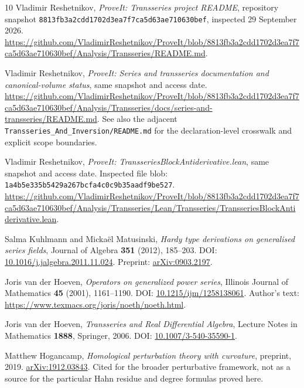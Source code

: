 \documentclass[11pt,a4paper]{article}
\numberwithin{equation}{section}
\theoremstyle{definition}
\theoremstyle{remark}
\begin{document}
\begin{thebibliography}{10}
\small
{}
Vladimir Reshetnikov, \emph{ProveIt: Transseries project README}, repository snapshot
\texttt{8813fb3a2cdd1702d3ea7f7ca5d63ae710630bef}, inspected 29 September 2026.
\url{https://github.com/VladimirReshetnikov/ProveIt/blob/8813fb3a2cdd1702d3ea7f7ca5d63ae710630bef/Analysis/Transseries/README.md}.

Vladimir Reshetnikov, \emph{ProveIt: Series and transseries documentation and canonical-volume status}, same snapshot and access date.
\url{https://github.com/VladimirReshetnikov/ProveIt/blob/8813fb3a2cdd1702d3ea7f7ca5d63ae710630bef/Analysis/Transseries/docs/series-and-transseries/README.md}.
See also the adjacent \texttt{Transseries\_And\_Inversion/README.md} for the declaration-level crosswalk and explicit scope boundaries.

Vladimir Reshetnikov, \emph{ProveIt: TransseriesBlockAntiderivative.lean}, same snapshot and access date. Inspected file blob:
\texttt{1a4b5e335b5429a267bcfa4c0c9b35aadf9be527}.
\url{https://github.com/VladimirReshetnikov/ProveIt/blob/8813fb3a2cdd1702d3ea7f7ca5d63ae710630bef/Analysis/Transseries/Lean/Transseries/TransseriesBlockAntiderivative.lean}.

Salma Kuhlmann and Micka\"el Matusinski,
\emph{Hardy type derivations on generalised series fields},
Journal of Algebra \textbf{351} (2012), 185--203.
DOI: \href{https://doi.org/10.1016/j.jalgebra.2011.11.024}{10.1016/j.jalgebra.2011.11.024}.
Preprint: \href{https://arxiv.org/abs/0903.2197}{arXiv:0903.2197}.

Joris van der Hoeven, \emph{Operators on generalized power series},
Illinois Journal of Mathematics \textbf{45} (2001), 1161--1190.
DOI: \href{https://doi.org/10.1215/ijm/1258138061}{10.1215/ijm/1258138061}.
Author's text: \url{https://www.texmacs.org/joris/noeth/noeth.html}.

Joris van der Hoeven, \emph{Transseries and Real Differential Algebra},
Lecture Notes in Mathematics \textbf{1888}, Springer, 2006.
DOI: \href{https://doi.org/10.1007/3-540-35590-1}{10.1007/3-540-35590-1}.

Matthew Hogancamp, \emph{Homological perturbation theory with curvature},
preprint, 2019.
\href{https://arxiv.org/abs/1912.03843}{arXiv:1912.03843}.
Cited for the broader perturbative framework, not as a source for the particular Hahn residue and degree formulas proved here.
\end{thebibliography}
\end{document}
